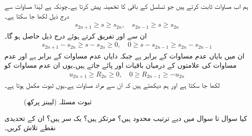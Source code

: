 ہم اب مساوات  ثابت کرتے ہیں جو تسلسل کے باقی کا تخمینہ پیش کرتا ہے۔چونکہ  ہے  لہٰذا مساوات  سے درج ذیل لکھا جا سکتا ہے۔
\begin{align*}
s_{2n+1}\ge s\ge s_{2n},\quad s_{2n-1}\ge s\ge s_{2n} 
\end{align*}
ان سے  اور  تفریق کرتے ہوئے درج ذیل حاصل ہو گا۔
\begin{align*}
s_{2n+1}-s_{2n}\ge s-s_{2n}\ge 0,\quad 0\ge s-s_{2n-1}\ge s_{2n}-s_{2n-1}
\end{align*}
ان میں بایاں عدم مساوات  کے برابر ہے جبکہ دایاں عدم مساوات  کے برابر ہے  اور عدم مساوات کی علامتوں کے درمیان باقیات  اور  پائے جاتے ہیں۔یوں ان عدم مساوات کو
\begin{align*}
u_{2n+1}\ge R_{2n}\ge 0,\quad 0\ge R_{2n-1}\ge -u_{2n}
\end{align*}  
لکھا جا سکتا ہے اور ہم دیکھتے ہیں کہ ان سے مراد مساوات  ہے۔یوں ثبوت مکمل ہوتا ہے۔
\begin{figure}
\centering
{}
\caption{ثبوت مسئلہ  (لیبنز پرکھ)}
\label{شکل_مسئلہ_ترتیب_آزمائش_لیبنٹز}
\end{figure}

کیا سوال  تا سوال  میں دیے ترتیب محدود ہیں؟ مرتکز ہیں؟ یک سر ہیں؟ ان کے تحدیدی نقطے تلاش کریں۔ 

